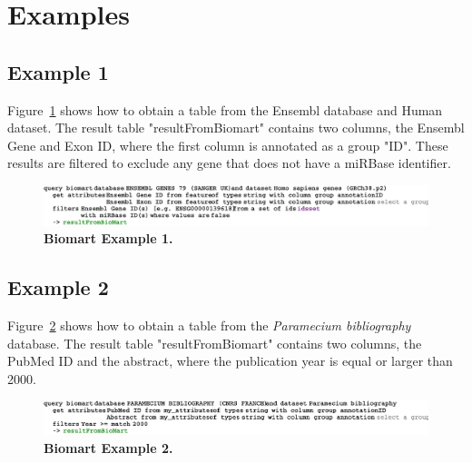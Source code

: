 \section{Examples}
\subsection{Example 1}
Figure~\ref{fig:BiomartExample1} shows how to obtain a table from the Ensembl database and Human dataset. The result table "resultFromBiomart" contains two columns, the Ensembl Gene and Exon ID, where the first column is annotated as a group "ID". These results are filtered to exclude any gene that does not have a miRBase identifier.
 \begin{figure}[h!tbp]
  \centering
  \includegraphics[width=\figWidthWide]{figures/BiomartExample1.pdf}
\caption[Biomart Example 1]{\textbf{ Biomart Example 1.}}
\label{fig:BiomartExample1}
\end{figure}

\subsection{Example 2}
Figure~\ref{fig:BiomartExample2} shows how to obtain a table from the \textit{Paramecium bibliography} database. The result table "resultFromBiomart" contains two columns, the PubMed ID and the abstract, where the publication year is equal or larger than 2000.
 \begin{figure}[h!tbp]
  \centering
  \includegraphics[width=\figWidthWide]{figures/BiomartExample2.pdf}
\caption[Biomart Example 2]{\textbf{ Biomart Example 2.}}
\label{fig:BiomartExample2}
\end{figure}
